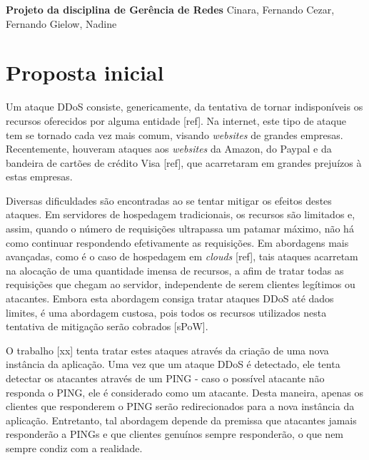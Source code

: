 \documentclass[a4paper, 11pt]{article}
\begin{document}
{
\begin{center}
{\LARGE \textbf{Projeto da disciplina de Gerência de Redes}}
\vskip 0.5cm
{\Large Cinara, Fernando Cezar, Fernando Gielow, Nadine}
\end{center}
}

\section{Proposta inicial}

Um ataque DDoS consiste, genericamente, da tentativa de tornar indisponíveis os recursos oferecidos por alguma entidade [ref]. Na internet, este tipo de ataque tem se tornado cada vez mais comum, visando \emph{websites} de grandes empresas. Recentemente, houveram ataques aos \emph{websites} da Amazon, do Paypal e da bandeira de cartões de crédito Visa [ref], que acarretaram em grandes prejuízos à estas empresas.

Diversas dificuldades são encontradas ao se tentar mitigar os efeitos destes ataques. Em servidores de hospedagem tradicionais, os recursos são limitados e, assim, quando o número de requisições ultrapassa um patamar máximo, não há como continuar respondendo efetivamente as requisições. Em abordagens mais avançadas, como é o caso de hospedagem em \emph{clouds} [ref], tais ataques acarretam na alocação de uma quantidade imensa de recursos, a afim de tratar todas as requisições que chegam ao servidor, independente de serem clientes legítimos ou atacantes. Embora esta abordagem consiga tratar ataques DDoS até dados limites, é uma abordagem custosa, pois todos os recursos utilizados nesta tentativa de mitigação serão cobrados [sPoW].

O trabalho [xx] tenta tratar estes ataques através da criação de uma nova instância da aplicação. Uma vez que um ataque DDoS é detectado, ele tenta detectar os atacantes através de um PING - caso o possível atacante não responda o PING, ele é considerado como um atacante. Desta maneira, apenas os clientes que responderem o PING serão redirecionados para a nova instância da aplicação. Entretanto, tal abordagem depende da premissa que atacantes jamais responderão a PINGs e que clientes genuínos sempre responderão, o que nem sempre condiz com a realidade. 
\end{document}
